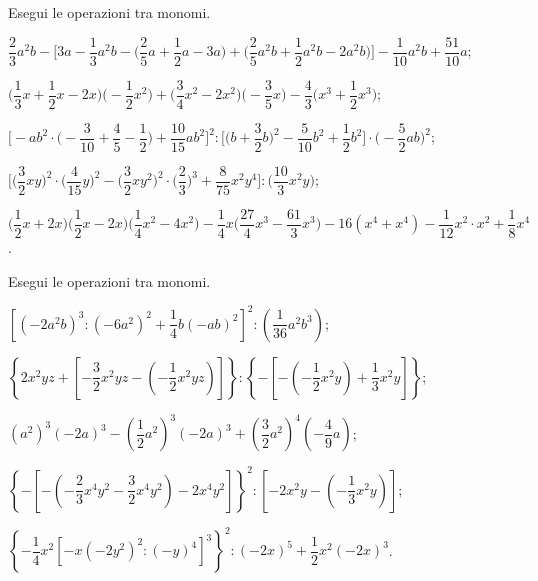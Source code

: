 \begin{esercizio}[\Ast]
 \label{ese:10.35} %
Esegui le operazioni tra monomi.

\begin{enumeratea}
 \item $\dfrac{2}{3}a^{2}b-\bigg[3a-\dfrac{1}{3}a^{2}b-\bigg(\dfrac{2}{5}a+\dfrac{1}{2}a-3a\bigg)+\bigg(\dfrac{2}{5}a^{2}b+\dfrac{1}{2}a^{2}b-2a^{2}b\bigg)\bigg]%
 -\dfrac{1}{10}a^{2}b+\dfrac{51}{10}a$;
 \item $\bigg(\dfrac{1}{3}x+\dfrac{1}{2}x-2x\bigg)\bigg(-{\dfrac{1}{2}x^{2}}\bigg)+\bigg(\dfrac{3}{4}x^{2}-2x^{2}\bigg)\bigg(-{\dfrac{3}{5}x}\bigg)%
 -\dfrac{4}{3}\bigg(x^{3}+\dfrac{1}{2}x^{3}\bigg)$;
 \item 
 $\Bigg[-ab^{2}\cdot\bigg(-{\dfrac{3}{10}}+\dfrac{4}{5}-\dfrac{1}{2}\bigg)+\dfrac{10}{15}ab^{2}\Bigg]^{2}:\bigg[\bigg(b+\dfrac{3}{2}b\bigg)^{2}-\dfrac{5}{10}b^{2}+\dfrac{1}{2}b^{2}\bigg]\cdot\bigg(-{\dfrac{5}{2}ab}\bigg)^{2}$;
 \item $\bigg[\bigg(\dfrac{3}{2}xy\bigg)^{2}\cdot(\dfrac{4}{15}y\bigg)^{2}-\bigg(\dfrac{3}{2}xy^{2}\bigg)^{2}\cdot\bigg(\dfrac{2}{3}\bigg)^{3}%
 +\dfrac{8}{75}x^{2}y^{4}\bigg]:\bigg(\dfrac{10}{3}x^{2}y\bigg)$;
 \item $\bigg(\dfrac{1}{2}x+2x\bigg)\bigg(\dfrac{1}{2}x-2x\bigg)\bigg(\dfrac{1}{4}x^{2}-4x^{2}\bigg)-\dfrac{1}{4}x\bigg(\dfrac{27}{4}x^{3}-\dfrac{61}{3}x^{3}\bigg)%
 -16(x^{4}+x^{4})-\dfrac{1}{12}x^{2}\cdot x^{2}+\dfrac{1}{8}x^{4}$.
\end{enumeratea}
\end{esercizio}

\begin{esercizio}[\Ast]
 \label{ese:10.36} %
Esegui le operazioni tra monomi.

\begin{enumeratea}
 \item $\left[\left(-2a^2b\right)^3:\left(-6a^2\right)^2+\dfrac{1}{4}b(-ab)^2\right]^2:\left(\dfrac{1}{36}a^2b^3\right)$;
 \item $\left\lbrace 2x^2yz+\left[-\dfrac{3}{2}x^2yz-\left(-\dfrac{1}{2}x^2yz\right)\right] \right\rbrace:\left\lbrace-\left[-\left(-\dfrac{1}{2}x^2y\right)+\dfrac{1}{3}x^2y\right] \right\rbrace$;
 \item $\left(a^2\right)^3(-2a)^3-\left(\dfrac{1}{2}a^2\right)^3(-2a)^3+\left(\dfrac{3}{2}a^2\right)^4\left(-\dfrac{4}{9}a\right)$;
 \item $\left\lbrace-\left[-\left(-\dfrac{2}{3}x^4y^2-\dfrac{3}{2}x^4y^2\right)-2x^4y^2\right]\right\rbrace^2:\left[-2x^2y-\left(-\dfrac{1}{3}x^2y\right)\right]$;
 \item $\left\lbrace-\dfrac{1}{4}x^2\left[-x\left(-2y^2\right)^2:(-y)^4\right]^3 \right\rbrace^2:(-2x)^5+\dfrac{1}{2}x^2(-2x)^3$.
\end{enumeratea}
\end{esercizio}

